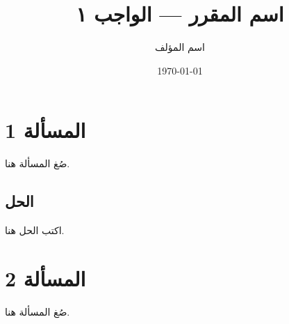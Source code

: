 \documentclass[11pt]{article}
\title{اسم المقرر — الواجب ١}
\author{اسم المؤلف}
\date{\today}
\begin{document}
\maketitle

\section*{المسألة 1}
صُغ المسألة هنا.

\subsection*{الحل}
اكتب الحل هنا.

\section*{المسألة 2}
صُغ المسألة هنا.
\end{document}
